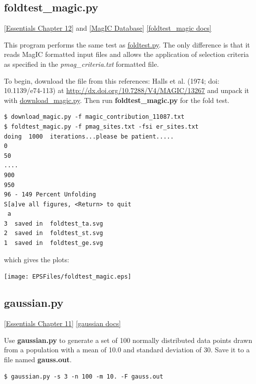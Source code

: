 \documentclass[11pt]{book}
\begin{document}
{{{\subsection{foldtest\_magic.py} \href{http://earthref.org/MAGIC/books/Tauxe/Essentials/WebBook3ch12.html#ch12}{[Essentials Chapter 12]} and \href{#MagICDatabase}{[MagIC Database]}
\href{https://github.com/PmagPy/PmagPy/blob/master/programs/foldtest_magic.py}{[foldtest\_magic docs]}

This program performs the same test as \href{#foldtest.py}{foldtest.py}.  The only difference is that it reads MagIC formatted input files and allows the application of selection criteria as specified in the {\it pmag\_criteria.txt} formatted file.


To begin, download the file from this references:  Halls et al. (1974; doi: 10.1139/e74-113) at \url{http://dx.doi.org/10.7288/V4/MAGIC/13267} and unpack it with  \href{#download_magic.py}{download\_magic.py}. Then run {\bf foldtest\_magic.py} for the fold test.

\begin{verbatim}
$ download_magic.py -f magic_contribution_11087.txt
$ foldtest_magic.py -f pmag_sites.txt -fsi er_sites.txt
doing  1000  iterations...please be patient.....
0
50
....
900
950
96 - 149 Percent Unfolding
S[a]ve all figures, <Return> to quit
 a
3  saved in  foldtest_ta.svg
2  saved in  foldtest_st.svg
1  saved in  foldtest_ge.svg

\end{verbatim}

\noindent  which gives the plots:

 {%
   \texttt{[image: EPSFiles/foldtest\_magic.eps]}


%
%

\subsection{gaussian.py}
 \href{http://earthref.org/MAGIC/books/Tauxe/Essentials/WebBook3ch11.html#ch11}{[Essentials Chapter 11]}
 \href{https://github.com/PmagPy/PmagPy/blob/master/programs/gaussian.py}{[gaussian docs]}


Use {\bf gaussian.py} to generate a set of 100 normally distributed data points drawn from a population with a mean of 10.0  and   standard deviation of 30.  Save it to a file named {\bf gauss.out}.

\begin{verbatim}
$ gaussian.py -s 3 -n 100 -m 10. -F gauss.out
\end{verbatim}

}}}}
\end{document}
